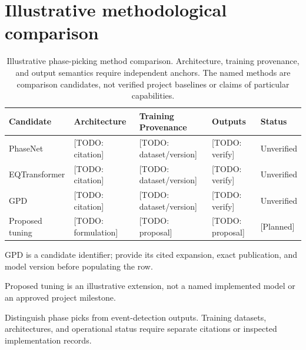 \documentclass{article}
\begin{document}
\section*{Illustrative methodological comparison}

\begin{table}[htbp]
  \centering
  \small
  \begin{threeparttable}
    \caption{Illustrative phase-picking method comparison.
      Architecture, training provenance, and output semantics require
      independent anchors. The named methods are comparison candidates,
      not verified project baselines or claims of particular capabilities.}
    \label{tab:method-comparison}
    \begin{tabularx}{\linewidth}{@{} l X X X l @{}}
      \toprule
      \textbf{Candidate} & \textbf{Architecture}
        & \textbf{Training Provenance} & \textbf{Outputs}
        & \textbf{Status} \\
      \midrule
      PhaseNet & [TODO: citation] & [TODO: dataset/version]
        & [TODO: verify] & Unverified \\
      EQTransformer & [TODO: citation] & [TODO: dataset/version]
        & [TODO: verify] & Unverified \\
      GPD\tnote{a} & [TODO: citation] & [TODO: dataset/version]
        & [TODO: verify] & Unverified \\
      Proposed tuning & [TODO: formulation] & [TODO: proposal]
        & [TODO: proposal] & [Planned]\tnote{b} \\
      \bottomrule
    \end{tabularx}
    \begin{tablenotes}[flushleft]
      \footnotesize
      \item[a] GPD is a candidate identifier; provide its cited expansion,
      exact publication, and model version before populating the row.
      \item[b] Proposed tuning is an illustrative extension, not a named
      implemented model or an approved project milestone.
      \item Distinguish phase picks from event-detection outputs. Training
      datasets, architectures, and operational status require separate
      citations or inspected implementation records.
    \end{tablenotes}
  \end{threeparttable}
\end{table}
\end{document}
